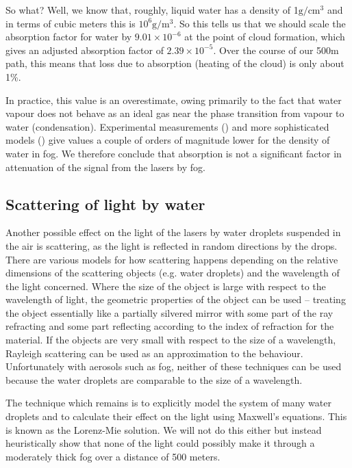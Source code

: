 So what? Well, we know that, roughly, liquid water has a density of
1$\text{g}/\text{cm}^3$ and in terms of cubic meters this is
$10^6\text{g}/\text{m}^3$. So this tells us that we should scale the
absorption factor for water by $9.01\times 10^{-6}$ at the point of
cloud formation, which gives an adjusted absorption factor of
$2.39\times 10^{-5}$. Over the course of our 500m path, this means
that loss due to absorption (heating of the cloud) is only about
1\%.

In practice, this value is an overestimate, owing primarily to the
fact that water vapour does not behave as an ideal gas near the phase
transition from vapour to water (condensation). Experimental
measurements (\cite{whiteman_cloud_1999}) and more sophisticated
models (\cite{tampieri_size_1976,hess_optical_1998}) give values a
couple of orders of magnitude lower for the density of water in
fog. We therefore conclude that absorption is not a significant factor
in attenuation of the signal from the lasers by fog.

\subsection{Scattering of light by water}
\label{sec:scattering}
Another possible effect on the light of the lasers by water droplets
suspended in the air is scattering, as the light is reflected in
random directions by the drops. There are various models for how
scattering happens depending on the relative dimensions of the
scattering objects (e.g. water droplets) and the wavelength of the
light concerned. Where the size of the object is large with respect to
the wavelength of light, the geometric properties of the object can be
used -- treating the object essentially like a partially silvered
mirror with some part of the ray refracting and some part reflecting
according to the index of refraction for the material. If the objects
are very small with respect to the size of a wavelength, Rayleigh
scattering can be used as an approximation to the
behaviour. Unfortunately with aerosols such as fog, neither of these
techniques can be used because the water droplets are comparable to
the size of a wavelength.

The technique which remains is to explicitly model the system of many
water droplets and to calculate their effect on the light using
Maxwell's equations. This is known as the Lorenz-Mie solution. We will
not do this either but instead heuristically show that none of the
light could possibly make it through a moderately thick fog over a
distance of 500 meters.

